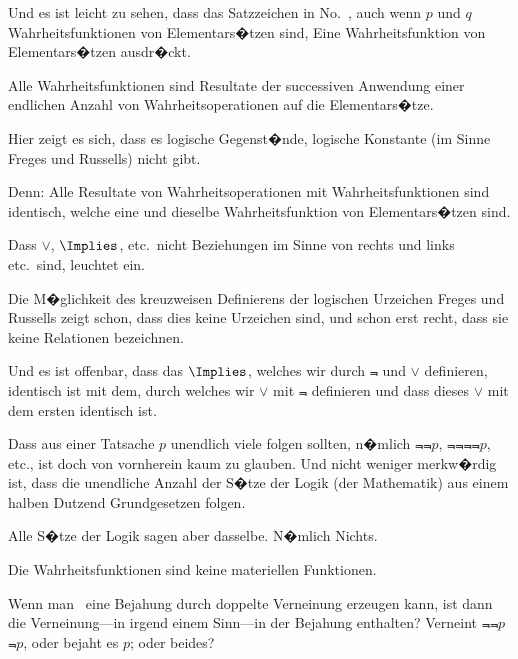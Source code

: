 \begin{propositions}
{{\verystretchyspace
Und es ist leicht zu sehen, dass das Satzzeichen
in No.~, auch wenn \glqq{}$p$\grqq{} und \glqq{}$q$\grqq{} Wahrheitsfunktionen
von Elementars�tzen sind, Eine
Wahrheitsfunktion von Elementars�tzen ausdr�ckt.}}


{Alle Wahrheitsfunktionen sind Resultate der
successiven Anwendung einer endlichen Anzahl
von Wahrheitsoperationen auf die Elementars�tze.}


{Hier zeigt es sich, dass es \glqq{}logische Gegenst�nde\grqq{},
\glqq{}logische Konstante\grqq{} (im Sinne Freges
und Russells) nicht gibt.}


{Denn: Alle Resultate von Wahrheitsoperationen
mit Wahrheitsfunktionen sind identisch,
welche eine und dieselbe Wahrheitsfunktion von
Elementars�tzen sind.}


{Dass $\lor$, $\Implies$, etc.\ nicht Beziehungen im Sinne von
rechts und links etc.\ sind, leuchtet ein.

Die M�glichkeit des kreuzweisen Definierens der
logischen \glqq{}Urzeichen\grqq{} Freges und Russells zeigt
schon, dass dies keine Urzeichen sind, und schon
erst recht, dass sie keine Relationen bezeichnen.

Und es ist offenbar, dass das \glqq{}$\Implies$\grqq{}, welches wir
durch \glqq{}$\Not{}$\grqq{} und \glqq{}$\lor$\grqq{} definieren, identisch ist mit dem,
durch welches wir \glqq{}$\lor$\grqq{} mit \glqq{}$\Not{}$\grqq{} definieren und dass
dieses \glqq{}$\lor$\grqq{} mit dem ersten identisch ist. \UndSoWeiter}


{Dass aus einer Tatsache $p$ unendlich viele
 folgen sollten, n�mlich $\Not{\Not{p}}$, $\Not{\Not{\Not{\Not{p}}}}$,
etc., ist doch von vornherein kaum zu glauben.
Und nicht weniger merkw�rdig ist, dass die unendliche
Anzahl der S�tze der Logik (der Mathematik)
aus einem halben Dutzend \glqq{}Grundgesetzen\grqq{} folgen.

Alle S�tze der Logik sagen aber dasselbe. N�mlich
Nichts.}


{Die Wahrheitsfunktionen sind keine materiellen
Funktionen.

Wenn man \zumBeispiel\ eine Bejahung durch doppelte
Verneinung erzeugen kann, ist dann die Verneinung---in
irgend einem Sinn\AllowBreak---in der Bejahung enthalten?
Verneint \glqq{}$\Not{\Not{p}}$\grqq{} $\Not{p}$, oder bejaht es $p$; oder beides?

}
\end{propositions}
